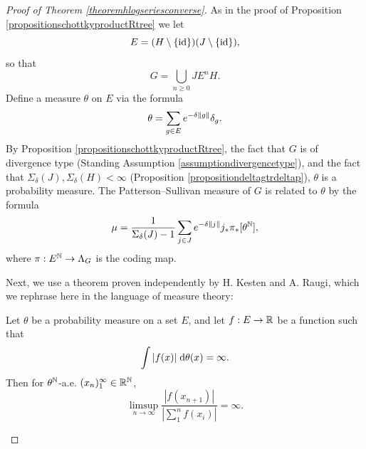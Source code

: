\begin{proof}[Proof of Theorem \ref{theoremhlogseriesconverse}]
As in the proof of Proposition \ref{propositionschottkyproductRtree} we let
\[
E = (H\setminus\{\mathrm{id}\})(J\setminus\{\mathrm{id}\}),
\]
so that
\[
G = \bigcup_{n\geq 0} J E^n H.%
\]
Define a measure $\theta$ on $E$ via the formula
\[
\theta = \sum_{g\in E} e^{-\delta\|g\|} \delta_g.
\]
By Proposition \ref{propositionschottkyproductRtree}, the fact that $G$ is of divergence type (Standing Assumption \ref{assumptiondivergencetype}), and the fact that $\Sigma_\delta(J),\Sigma_\delta(H) < \infty$ (Proposition \ref{propositiondeltagtrdeltap}), $\theta$ is a probability measure. The Patterson--Sullivan measure of $G$ is related to $\theta$ by the formula
\[
\mu = \frac{1}{\Sigma_\delta(J) - 1}\sum_{j\in J} e^{-\delta\dogo j} j_* \pi_*[\theta^\N],
\]
where $\pi:E^\N \to \Lambda_G$ is the coding map.

Next, we use a theorem proven independently by H. Kesten and A. Raugi, which we rephrase here in the language of measure theory:

\begin{theorem}
\label{theoremkesten}
Let $\theta$ be a probability measure on a set $E$, and let $f:E\to\R$ be a function such that
\[
\int |f(x)| \;\mathrm{d}\theta(x) = \infty.
\]
Then for $\theta^\N$-a.e. $(x_n)_1^\infty \in \R^\N$,
\[
\limsup_{n\to\infty} \frac{|f(x_{n + 1})|}{|\sum_1^n f(x_i)|} = \infty.
\]
\end{theorem}


\end{proof}
